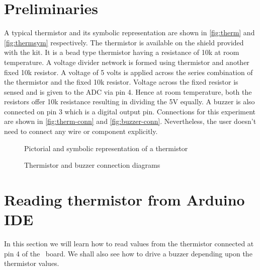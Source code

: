 \section{Preliminaries}
A typical thermistor and its symbolic representation are shown in
\ref{fig:therm} and \ref{fig:thermsym} respectively. The thermistor is
available on the shield provided with the kit.  It is a bead type
thermistor having a resistance of 10k at room temperature. A voltage
divider network is formed using thermistor and another fixed 10k
resistor. A voltage of 5 volts is applied across the series
combination of the thermistor and the fixed 10k resistor. Voltage
across the fixed resistor is sensed and is given to the ADC via pin
4. Hence at room temperature, both the resistors offer 10k resistance
resulting in dividing the 5V equally. A buzzer is also connected on
pin 3 which is a digital output pin.
Connections for this experiment are shown in \ref{fig:therm-conn}
and \ref{fig:buzzer-conn}.  Nevertheless, the user doesn't need to
connect any wire or component explicitly.


\begin{figure}
\centering
{} \hfill
{}
\caption{Pictorial and symbolic representation of a thermistor}
\end{figure}


\begin{figure}
\centering
{} \hfill
{}
\caption{Thermistor and buzzer connection diagrams}
\end{figure}

\section{Reading thermistor from Arduino IDE}
In this section we will learn how to read values from the thermistor connected at pin 4 of the \arduino\ board. We shall also see how to drive a buzzer depending upon the thermistor values.

